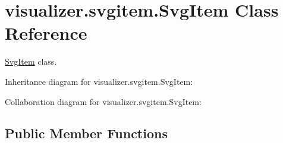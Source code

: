 \hypertarget{classvisualizer_1_1svgitem_1_1SvgItem}{}\section{visualizer.\+svgitem.\+Svg\+Item Class Reference}
\label{classvisualizer_1_1svgitem_1_1SvgItem}


\hyperlink{classvisualizer_1_1svgitem_1_1SvgItem}{Svg\+Item} class.  




Inheritance diagram for visualizer.\+svgitem.\+Svg\+Item\+:


Collaboration diagram for visualizer.\+svgitem.\+Svg\+Item\+:
\subsection*{Public Member Functions}
